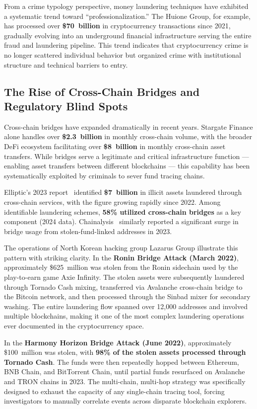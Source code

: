 \documentclass[12pt,a4paper]{article}
\begin{document}
From a crime typology perspective, money laundering techniques have exhibited a systematic trend toward ``professionalization.'' The Huione Group, for example, has processed over \textbf{\$70~billion} in cryptocurrency transactions since 2021, gradually evolving into an underground financial infrastructure serving the entire fraud and laundering pipeline. This trend indicates that cryptocurrency crime is no longer scattered individual behavior but organized crime with institutional structure and technical barriers to entry.

\subsection{The Rise of Cross-Chain Bridges and Regulatory Blind Spots}

Cross-chain bridges have expanded dramatically in recent years. Stargate Finance alone handles over \textbf{\$2.3~billion} in monthly cross-chain volume, with the broader DeFi ecosystem facilitating over \textbf{\$8~billion} in monthly cross-chain asset transfers. While bridges serve a legitimate and critical infrastructure function --- enabling asset transfers between different blockchains --- this capability has been systematically exploited by criminals to sever fund tracing chains.

Elliptic's 2023 report~\cite{elliptic2023} identified \textbf{\$7~billion} in illicit assets laundered through cross-chain services, with the figure growing rapidly since 2022. Among identifiable laundering schemes, \textbf{58\% utilized cross-chain bridges} as a key component (2024 data). Chainalysis~\cite{chainalysis2024} similarly reported a significant surge in bridge usage from stolen-fund-linked addresses in 2023.

The operations of North Korean hacking group Lazarus Group illustrate this pattern with striking clarity. In the \textbf{Ronin Bridge Attack (March 2022)}, approximately \$625~million was stolen from the Ronin sidechain used by the play-to-earn game Axie Infinity. The stolen assets were subsequently laundered through Tornado Cash mixing, transferred via Avalanche cross-chain bridge to the Bitcoin network, and then processed through the Sinbad mixer for secondary washing. The entire laundering flow spanned over 12,000 addresses and involved multiple blockchains, making it one of the most complex laundering operations ever documented in the cryptocurrency space.

In the \textbf{Harmony Horizon Bridge Attack (June 2022)}, approximately \$100~million was stolen, with \textbf{98\% of the stolen assets processed through Tornado Cash}. The funds were then repeatedly hopped between Ethereum, BNB Chain, and BitTorrent Chain, until partial funds resurfaced on Avalanche and TRON chains in 2023. The multi-chain, multi-hop strategy was specifically designed to exhaust the capacity of any single-chain tracing tool, forcing investigators to manually correlate events across disparate blockchain explorers.
\end{document}
